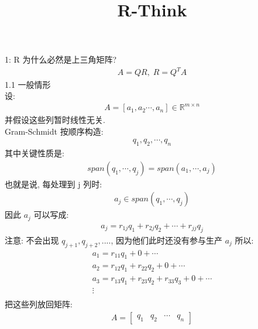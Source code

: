 \documentclass[12pt]{article}
\title{R-Think}
\date{}
\begin{document}
\maketitle
\begin{flushleft}
    1: R 为什么必然是上三角矩阵? \\
    \begin{align}
        A = QR, \; R = Q^{T}A
    \end{align}
    1.1 一般情形  \\
    设: \\
    \begin{align}
        A = [a_{1},a_{2} \cdots ,a_{n}] \in \mathbb{R}^{m \times n}
    \end{align}
    并假设这些列暂时线性无关. \\
    Gram-Schmidt 按顺序构造: \\
    \begin{align}
        q_{1}, q_{2}, \cdots , q_{n}
    \end{align}
    其中关键性质是: \\
    \begin{align}
        span(q_{1},\cdots,q_{j}) = span(a_{1},\cdots, a_{j})
    \end{align}
    也就是说, 每处理到 j 列时: \\
    \begin{align}
        a_{j} \in span(q_{1},\cdots, q_{j})
    \end{align}
    因此 $a_{j}$ 可以写成: \\
    \begin{align}
        a_{j} = r_{1j}q_{1} + r_{2j}q_{2} + \cdots  + r_{jj}q_{j}
    \end{align}
    注意: 不会出现 $q_{j + 1}, q_{j + 2}, ....$, 因为他们此时还没有参与生产 $a_{j}$
    所以: \\
    \begin{align}
        a_{1} = r_{11}q_{1} + 0 + \cdots                             \\
        a_{2} = r_{12}q_{1} + r_{22}q_{2} + 0 + \cdots               \\
        a_{3} = r_{13}q_{1} + r_{23}q_{2} + r_{33}q_{3} + 0 + \cdots \\
        \vdots                                                       \\
    \end{align}
    把这些列放回矩阵: \\
    \begin{align}
        A = \begin{bmatrix} q_1 & q_2 & \cdots & q_n \end{bmatrix}

\end{align}
\end{flushleft}
\end{document}

